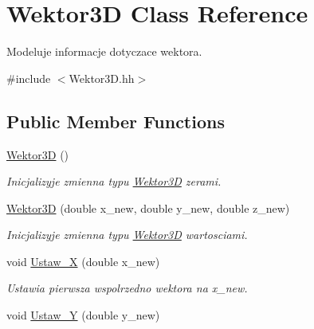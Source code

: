 \hypertarget{class_wektor3_d}{\section{Wektor3\+D Class Reference}
\label{class_wektor3_d}
}


Modeluje informacje dotyczace wektora.  




{\ttfamily \#include $<$Wektor3\+D.\+hh$>$}

\subsection*{Public Member Functions}
\begin{DoxyCompactItemize}
\item 
\hypertarget{class_wektor3_d_a7c48a57fd36c0af29e26c825f90a973f}{\hyperlink{class_wektor3_d_a7c48a57fd36c0af29e26c825f90a973f}{Wektor3\+D} ()}\label{class_wektor3_d_a7c48a57fd36c0af29e26c825f90a973f}

\begin{DoxyCompactList}\small\item\em Inicjalizyje zmienna typu \hyperlink{class_wektor3_d}{Wektor3\+D} zerami. \end{DoxyCompactList}\item 
\hyperlink{class_wektor3_d_ad196faabac520da52d22323e052f7ae3}{Wektor3\+D} (double x\+\_\+new, double y\+\_\+new, double z\+\_\+new)
\begin{DoxyCompactList}\small\item\em Inicjalizyje zmienna typu \hyperlink{class_wektor3_d}{Wektor3\+D} wartosciami. \end{DoxyCompactList}\item 
\hypertarget{class_wektor3_d_a8d9ce0735c79f7d0c07dea78e5b7fad2}{void \hyperlink{class_wektor3_d_a8d9ce0735c79f7d0c07dea78e5b7fad2}{Ustaw\+\_\+\+X} (double x\+\_\+new)}\label{class_wektor3_d_a8d9ce0735c79f7d0c07dea78e5b7fad2}

\begin{DoxyCompactList}\small\item\em Ustawia pierwsza wspolrzedno wektora na x\+\_\+new. \end{DoxyCompactList}\item 
\hypertarget{class_wektor3_d_a746c7e2d929e0cf81528c399eddd0935}{void \hyperlink{class_wektor3_d_a746c7e2d929e0cf81528c399eddd0935}{Ustaw\+\_\+\+Y} (double y\+\_\+new)}\label{class_wektor3_d_a746c7e2d929e0cf81528c399eddd0935}


\end{DoxyCompactItemize}
